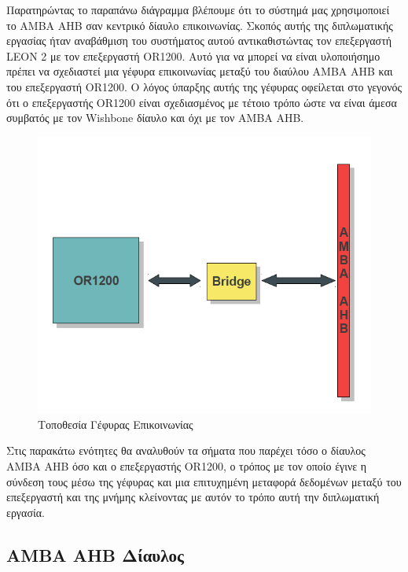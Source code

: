 \documentclass[a4paper,10pt]{article}
\numberwithin{figure}{section}
\numberwithin{table}{section}
\begin{document}
\vspace{0.7cm}
\newpage
Παρατηρώντας το παραπάνω διάγραμμα βλέπουμε ότι το σύστημά μας χρησιμοποιεί το AMBA AHB σαν κεντρικό δίαυλο επικοινωνίας. Σκοπός αυτής της διπλωματικής εργασίας ήταν αναβάθμιση του συστήματος αυτού αντικαθιστώντας τον επεξεργαστή LEON 2 με τον επεξεργαστή OR1200. Αυτό για να μπορεί να είναι υλοποιήσημο πρέπει να σχεδιαστεί μια γέφυρα επικοινωνίας μεταξύ του διαύλου AMBA AHB και του επεξεργαστή OR1200. Ο λόγος ύπαρξης αυτής της γέφυρας οφείλεται στο γεγονός ότι ο επεξεργαστής OR1200 είναι σχεδιασμένος με τέτοιο τρόπο ώστε να είναι άμεσα συμβατός με τον Wishbone δίαυλο και όχι με τον ΑMBA ΑΗΒ. 
\vspace{0.7cm}
\begin{figure}[h!]
 \centering
 \includegraphics[bb=0 0 614 509,scale=0.5]{./Images/OR1200_br_ahb.png}
 \caption{Τοποθεσία Γέφυρας Επικοινωνίας}
\end{figure}
\vspace{0.7cm}

Στις παρακάτω ενότητες θα αναλυθούν τα σήματα που παρέχει τόσο ο δίαυλος AMBA AHB όσο και ο επεξεργαστής OR1200, ο τρόπος με τον οποίο έγινε η σύνδεση τους μέσω της γέφυρας και μια επιτυχημένη μεταφορά δεδομένων μεταξύ του επεξεργαστή και της μνήμης κλείνοντας με αυτόν το τρόπο αυτή την διπλωματική εργασία.

\newpage
\subsection{AMBA AHB Δίαυλος}
\end{document}

